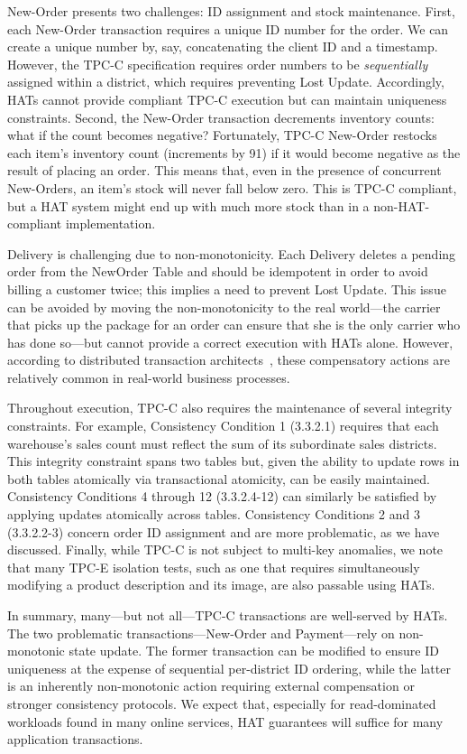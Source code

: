 New-Order presents two challenges: ID assignment and stock
maintenance. First, each New-Order transaction requires a unique ID
number for the order. We can create a unique number by, say,
concatenating the client ID and a timestamp. However, the TPC-C
specification requires order numbers to be \textit{sequentially}
assigned within a district, which requires preventing Lost
Update. Accordingly, HATs cannot provide compliant TPC-C execution but
can maintain uniqueness constraints. Second, the New-Order transaction
decrements inventory counts: what if the count becomes negative?
Fortunately, TPC-C New-Order restocks each item's inventory count
(increments by 91) if it would become negative as the result of
placing an order. This means that, even in the presence of concurrent
New-Orders, an item's stock will never fall below zero. This is TPC-C
compliant, but a HAT system might end up with much more stock
than in a non-HAT-compliant implementation.

Delivery is challenging due to non-monotonicity. Each Delivery deletes
a pending order from the NewOrder Table and should be idempotent in
order to avoid billing a customer twice; this implies a need to
prevent Lost Update. This issue  can be avoided  by moving the
non-monotonicity to the real world---the carrier that picks up the
package for an order can ensure that she is the only carrier who has
done so---but cannot provide a correct execution with HATs
alone. However, according to distributed transaction
architects~\cite{entitygroup}, these compensatory actions are
relatively common in real-world business processes.

Throughout execution, TPC-C also requires the maintenance of several
integrity constraints. For example, Consistency Condition 1 (3.3.2.1)
requires that each warehouse's sales count must reflect the sum of its
subordinate sales districts. This integrity constraint spans two
tables but, given the ability to update rows in both tables atomically
via transactional atomicity, can be easily maintained. Consistency
Conditions 4 through 12 (3.3.2.4-12) can similarly be satisfied by
applying updates atomically across tables. Consistency Conditions 2
and 3 (3.3.2.2-3) concern order ID assignment and are more
problematic, as we have discussed.  Finally, while TPC-C is not
subject to multi-key anomalies, we note that many TPC-E isolation
tests, such as one that requires simultaneously modifying a product
description and its image, are also passable using HATs.

In summary, many---but not all---TPC-C transactions are well-served by
HATs. The two problematic transactions---New-Order and Payment---rely
on non-monotonic state update. The former transaction can be modified
to ensure ID uniqueness at the expense of sequential per-district ID
ordering, while the latter is an inherently non-monotonic action
requiring external compensation or stronger consistency protocols. We
expect that, especially for read-dominated workloads found in many
online services, HAT guarantees will suffice for many application
transactions.

